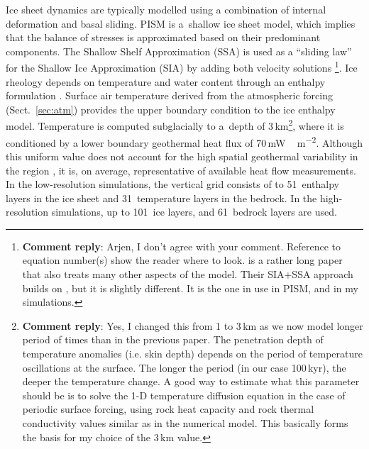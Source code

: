 \documentclass[tc, manuscript]{copernicus}
\newcommand{\renote}[1]{\footnote{\textbf{Comment reply}: #1}}
\begin{document}
Ice sheet dynamics are typically modelled using a combination of internal
deformation and basal sliding. PISM is a~shallow ice sheet model, which implies
that the balance of stresses is approximated based on their predominant
components. The Shallow Shelf Approximation (SSA) is used as a ``sliding law''
for the Shallow Ice Approximation (SIA) by adding both velocity solutions
\citep[Eqns.~7--9 and 15]{Bueler.Brown.2009, Winkelmann.etal.2011}\renote{
    Arjen, I don't agree with your comment. Reference to equation number(s)
    show the reader where to look. \citet{Winkelmann.etal.2011} is a rather
    long paper that also treats many other aspects of the model. Their SIA+SSA
    approach builds on \citep{Bueler.Brown.2009}, but it is slightly different.
    It is the one in use in PISM, and in my simulations.}.
Ice rheology depends on temperature and water content through an enthalpy
formulation \citep{Aschwanden.etal.2012}. Surface air temperature derived from
the atmospheric forcing (Sect.~\ref{sec:atm}) provides the upper boundary
condition to the ice enthalpy model. Temperature is computed subglacially to
a~depth of 3\,km\renote{
    Yes, I changed this from 1 to 3\,km as we now model longer period of times
    than in the previous paper. The penetration depth of temperature anomalies
    (i.e. skin depth) depends on the period of temperature oscillations at the
    surface. The longer the period (in our case 100\,kyr), the deeper the
    temperature change. A good way to estimate what this parameter should be is
    to solve the 1-D temperature diffusion equation in the case of periodic
    surface forcing, using rock heat capacity and rock thermal conductivity
    values similar as in the numerical model. This basically forms the basis
    for my choice of the 3\,km value.},
where it is conditioned by a lower boundary geothermal heat flux of
70\,\unit{mW\,m^{-2}}. Although this uniform value does not account for the
high spatial geothermal variability in the region
\citep{Blackwell.Richards.2004}, it is, on average, representative of available
heat flow measurements. In the low-resolution simulations, the vertical grid
consists of to 51~enthalpy layers in the ice sheet and 31~temperature layers in
the bedrock. In the high-resolution simulations, up to 101~ice layers, and
61~bedrock layers are used.
\end{document}
